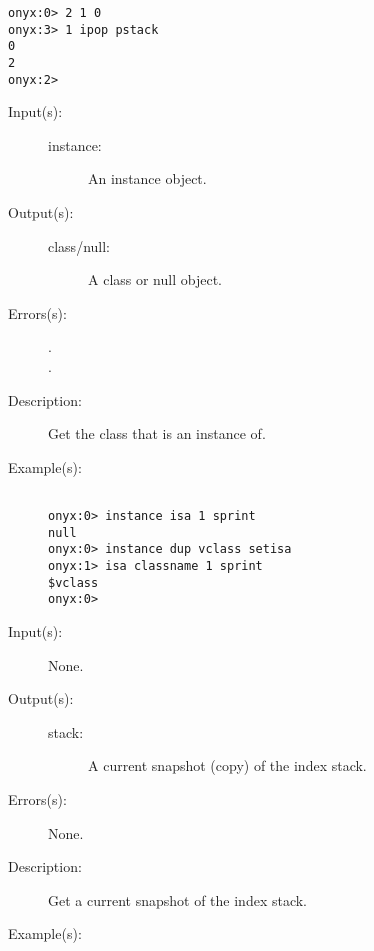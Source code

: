 \begin{description}
\begin{description}
\begin{verbatim}
onyx:0> 2 1 0
onyx:3> 1 ipop pstack
0
2
onyx:2>
		\end{verbatim}
	\end{description}
\label{systemdict:isa}
\item[{\onyxop{instance}{isa}{class/null}}: ]
	\begin{description}\item[]
	\item[Input(s): ]
		\begin{description}\item[]
		\item[instance: ]
			An instance object.
		\end{description}
	\item[Output(s): ]
		\begin{description}\item[]
		\item[class/null: ]
			A class or null object.
		\end{description}
	\item[Errors(s): ]
		\begin{description}\item[]
		\item[.]
		\item[.]
		\end{description}
	\item[Description: ]
		Get the class  that  is an
		instance of.
	\item[Example(s): ]\begin{verbatim}

onyx:0> instance isa 1 sprint
null
onyx:0> instance dup vclass setisa
onyx:1> isa classname 1 sprint
$vclass
onyx:0>
		\end{verbatim}
	\end{description}
\label{systemdict:istack}
\item[{\onyxop{--}{istack}{stack}}: ]
	\begin{description}\item[]
	\item[Input(s): ] None.
	\item[Output(s): ]
		\begin{description}\item[]
		\item[stack: ]
			A current snapshot (copy) of the index stack.
		\end{description}
	\item[Errors(s): ] None.
	\item[Description: ]
		Get a current snapshot of the index stack.
	\item[Example(s): ]\begin{verbatim}


\end{verbatim}
\end{description}
\end{description}
